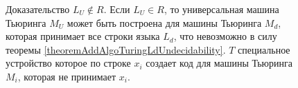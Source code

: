 \begin{figure}
\centering



\caption{Доказательство $L_U \notin R$. 
  Если $L_U \in R$, то универсальная машина Тьюринга $M_U$ может быть
  построена для машины Тьюринга $M_d$, которая принимает все строки
  языка $L_d$, что невозможно в силу теоремы 
  \ref {theoremAddAlgoTuringLdUndecidability}. $T$ специальное
  устройство которое по строке $x_i$ создает код для машины Тьюринга
  $M_i$, которая не принимает $x_i$.}
\label{figAddAlgoUTuringProof}
\end{figure}
